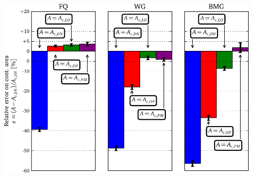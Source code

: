 \documentclass[a0paper,portrait]{baposter}
\begin{document}
\begin{poster}
{\includegraphics[width=\linewidth]{figure_7}\\
%

}

\end{poster}
\end{document}
